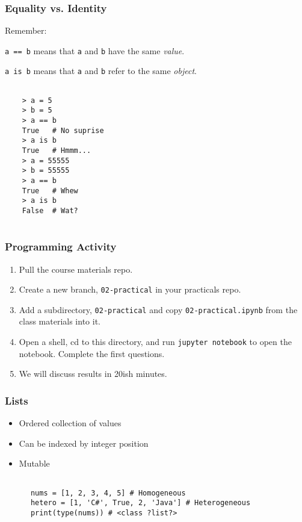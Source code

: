 \documentclass[10pt]{beamer}
\begin{document}
\begin{frame}[fragile]
  \frametitle{Equality vs. Identity}
   
   Remember:
   
   \texttt{a == b} means that \texttt{a} and \texttt{b} have the same \emph{value}.
   
   \texttt{a is b} means that \texttt{a} and \texttt{b} refer to the same \emph{object}.

  
   \begin{verbatim}
  
    > a = 5
    > b = 5
    > a == b
    True   # No suprise
    > a is b
    True   # Hmmm...
    > a = 55555
    > b = 55555
    > a == b
    True   # Whew
    > a is b
    False  # Wat?
   
   \end{verbatim}
  
  
\end{frame}
\begin{frame}
  \frametitle{Programming Activity}
  
  \begin{enumerate}
    \item Pull the course materials repo.
    \item Create a new branch, \texttt{02-practical} in your practicals repo.
    \item Add a subdirectory,  \texttt{02-practical} and copy \texttt{02-practical.ipynb} from the class materials into it.
    \item Open a shell, cd to this directory, and run \texttt{jupyter notebook} to open the notebook. Complete the first questions.
    \item We will discuss results in 20ish minutes.
  \end{enumerate}      
\end{frame}

\begin{frame}[fragile]
  \frametitle{Lists}
   
   \begin{itemize}
     \item Ordered collection of values
     \item Can be indexed by integer position
     \item Mutable
   
   \end{itemize}
   
   

  
   \begin{verbatim}
  
      nums = [1, 2, 3, 4, 5] # Homogeneous
      hetero = [1, 'C#', True, 2, 'Java'] # Heterogeneous
      print(type(nums)) # <class ?list?>
   
   \end{verbatim}
  
  
\end{frame}
\end{document}
